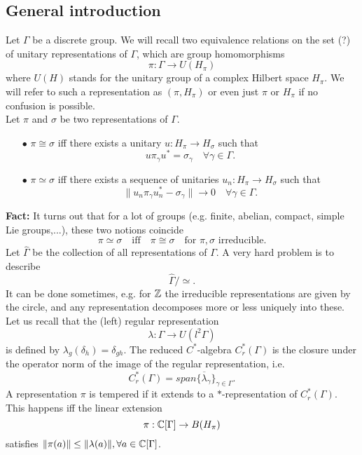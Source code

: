 \subsection{General introduction}

Let $\Gamma$ be a discrete group. We will recall two equivalence relations on the set (?) of unitary representations of $\Gamma$, which are group homomorphisms
\[\pi: \Gamma \rightarrow U(H_\pi) \]
where $U(H)$ stands for the unitary group of a complex Hilbert space $H_\pi$. We will refer to such a representation as $(\pi, H_\pi)$ or even just $\pi$ or $H_\pi$ if no confusion is possible.\\

Let $\pi$ and $\sigma$ be two representations of $\Gamma$.
\begin{itemize}
\item[$\bullet$] $\pi \cong \sigma$ iff there exists a unitary $u : H_\pi \rightarrow H_\sigma$ such that
\[ u\pi_\gamma u^* =\sigma_\gamma \quad \forall \gamma \in \Gamma.\]
\item[$\bullet$] $\pi \simeq \sigma$ iff there exists a sequence of unitaries $u_n : H_\pi \rightarrow H_\sigma$ such that
\[ \| u_n\pi_\gamma u_n^* - \sigma_\gamma \| \rightarrow 0\quad \forall \gamma\in \Gamma.\]
\end{itemize}

\textbf{Fact:} It turns out that for a lot of groups (e.g. finite, abelian, compact, simple Lie groups,...), these two notions coincide
\[ \pi \simeq \sigma \quad \text{iff}\quad \pi \cong \sigma \quad \text{for }\pi,\sigma \text{ irreducible}.\]
Let $\hat \Gamma$ be the collection of all representations of $\Gamma$. A very hard problem is to describe
\[\hat \Gamma / \simeq.\]
It can be done sometimes, e.g. for $\mathbb Z$ the irreducible representations are given by the circle, and any representation decomposes more or less uniquely into these.\\

Let us recall that the (left) regular representation 
\[\lambda: \Gamma \rightarrow U(l^2\Gamma)\]
is defined by $\lambda_g(\delta_h) = \delta_{gh}$. The reduced $C^*$-algebra $C_r^*(\Gamma)$ is the closure under the operator norm of the image of the regular representation, i.e.
\[C^*_r(\Gamma) = \overline{span \{ \lambda_\gamma\}_{\gamma\in \Gamma}}.\]
A representation $\pi $ is tempered if it extends to a $*$-representation of $C^*_r(\Gamma)$. This happens iff the linear extension
\[\pi : \mathbb C[\Gamma]\rightarrow B(H_\pi)\]
satisfies $\|\pi(a)\| \leq \|\lambda(a)\|, \forall a\in \mathbb C[\Gamma]$.\\

